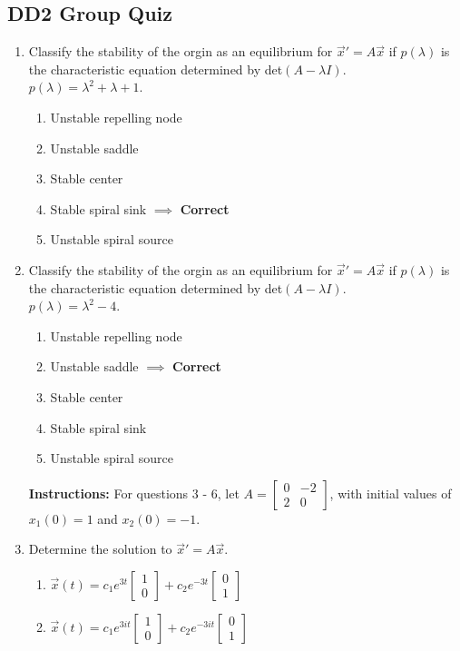 \documentclass[11pt]{article}
\begin{document}
\subsection*{DD2 Group Quiz}
\begin{enumerate}
	\item Classify the stability of the orgin as an equilibrium for $\vec{x}' = A\vec{x}$ if $p(\lambda)$ is the characteristic equation determined by det$(A-\lambda I)$.\\$p(\lambda) = \lambda^2 + \lambda+1$.
	\begin{enumerate}
		\item Unstable repelling node
		\item Unstable saddle
		\item Stable center
		\item Stable spiral sink $\implies$ \textbf{Correct}
		\item Unstable spiral source
	\end{enumerate}
	\item Classify the stability of the orgin as an equilibrium for $\vec{x}' = A\vec{x}$ if $p(\lambda)$ is the characteristic equation determined by det$(A-\lambda I)$.\\$p(\lambda) = \lambda^2 -4$.
	\begin{enumerate}
		\item Unstable repelling node
		\item Unstable saddle $\implies$ \textbf{Correct}
		\item Stable center
		\item Stable spiral sink 
		\item Unstable spiral source
	\end{enumerate}
	\textbf{Instructions:} For questions 3 - 6, let $A = \begin{bmatrix}
	0&-2\\2&0
	\end{bmatrix}$, with initial values of $x_1(0) = 1$ and $x_2(0) = -1$.
	\item Determine the solution to $\vec{x}' = A\vec{x}$.
	\begin{enumerate}
		\item $\vec{x}(t) = c_1e^{3t}\begin{bmatrix}1\\0 \end{bmatrix} + c_2e^{-3t}\begin{bmatrix}0\\1 \end{bmatrix}$
		\item $\vec{x}(t) = c_1e^{3it}\begin{bmatrix}1\\0 \end{bmatrix} + c_2e^{-3it}\begin{bmatrix}0\\1 \end{bmatrix}$

\end{enumerate}
\end{enumerate}
\end{document}
